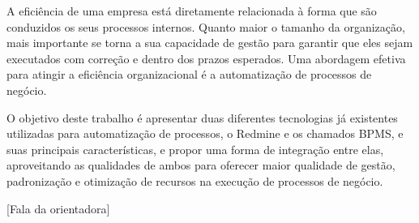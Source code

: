 A eficiência de uma empresa está diretamente relacionada à forma que são conduzidos os seus processos internos. Quanto maior o tamanho da organização, mais importante se torna a sua capacidade de gestão para garantir que eles sejam executados com correção e dentro dos prazos esperados. Uma abordagem efetiva para atingir a eficiência organizacional é a automatização de processos de negócio.

O objetivo deste trabalho é apresentar duas diferentes tecnologias já existentes utilizadas para automatização de processos, o Redmine e os chamados BPMS, e suas principais características, e propor uma forma de integração entre elas, aproveitando as qualidades de ambos para oferecer maior qualidade de gestão, padronização e otimização de recursos na execução de processos de negócio.

[Fala da orientadora]